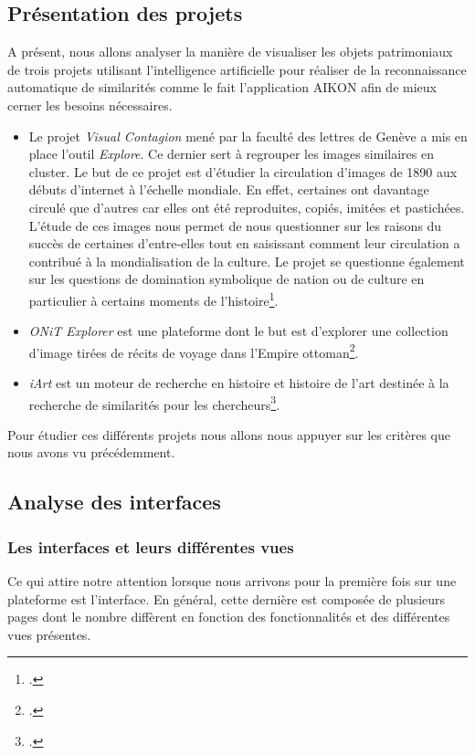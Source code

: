 \subsection{Présentation des projets}

A présent, nous allons analyser la manière de visualiser les objets patrimoniaux de trois projets utilisant l'intelligence artificielle pour réaliser de la reconnaissance automatique de similarités comme le fait l'application AIKON afin de mieux cerner les besoins nécessaires.

\begin{itemize}
	\item Le projet \textit{Visual Contagion} mené par la faculté des lettres de Genève a mis en place l'outil \textit{Explore}. Ce dernier sert à regrouper les images similaires en cluster. Le but de ce projet est d'étudier la circulation d'images de 1890 aux débuts d'internet à l'échelle mondiale. En effet, certaines ont davantage circulé que d'autres car elles ont été reproduites, copiés, imitées et pastichées. L'étude de ces images nous permet de nous questionner sur les raisons du succès de certaines d'entre-elles tout en saisissant comment leur circulation a contribué à la mondialisation de la culture. Le projet se questionne également sur les questions de domination symbolique de nation ou de culture en particulier à certains moments de l'histoire\footcite{HomeVisualContagions}.
	\item \textit{ONiT Explorer} est une plateforme dont le but est d'explorer une collection d'image tirées de récits de voyage dans l'Empire ottoman\footcite{ONiTExplorer}.
	\item \textit{iArt} est un moteur de recherche en histoire et histoire de l'art destinée à la recherche de similarités pour les chercheurs\footcite{IART}.
\end{itemize}

Pour étudier ces différents projets nous allons nous appuyer sur les critères que nous avons vu précédemment. 

\subsection{Analyse des interfaces}

\subsubsection{Les interfaces et leurs différentes vues}

Ce qui attire notre attention lorsque nous arrivons pour la première fois sur une plateforme est l'interface. En général, cette dernière est composée de plusieurs pages dont le nombre diffèrent en fonction des fonctionnalités et des différentes vues présentes. 

